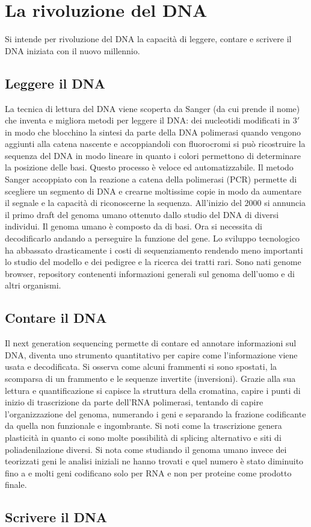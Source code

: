 \section{La rivoluzione del DNA}
Si intende per rivoluzione del DNA la capacit\`a di leggere, contare e scrivere il DNA iniziata con il nuovo millennio. 
\subsection{Leggere il DNA}
La tecnica di lettura del DNA viene scoperta da Sanger (da cui prende il nome) che inventa e migliora metodi per leggere il DNA: dei nucleotidi modificati in $3'$ in modo che blocchino
la sintesi da parte della DNA polimerasi quando vengono aggiunti alla catena nascente e accoppiandoli con fluorocromi si pu\`o ricostruire la sequenza del DNA in modo lineare in quanto
i colori permettono di determinare la posizione delle basi. Questo processo \`e veloce ed automatizzabile. Il metodo Sanger accoppiato con la reazione a catena della polimerasi (PCR)
permette di scegliere un segmento di DNA e crearne moltissime copie  in modo da aumentare il segnale e la capacit\`a di riconoscerne la sequenza. All'inizio del $2000$ si annuncia il 
primo draft del genoma umano ottenuto dallo studio del DNA di diversi individui. Il genoma umano \`e composto da  di basi. Ora si necessita di decodificarlo 
andando a perseguire la funzione del gene. Lo sviluppo tecnologico ha abbassato drasticamente i costi di sequenziamento rendendo meno importanti lo studio del modello e dei pedigree e 
la ricerca dei tratti rari. Sono nati genome browser, repository contenenti informazioni generali sul genoma dell'uomo e di altri organismi. 
\subsection{Contare il DNA}
Il next generation sequencing permette di contare ed annotare informazioni sul DNA, diventa uno strumento quantitativo per capire come l'informazione viene usata e decodificata. Si 
osserva come alcuni frammenti si sono spostati, la scomparsa di un frammento e le sequenze invertite (inversioni). Grazie alla sua lettura e quantificazione si capisce la struttura della
cromatina, capire i punti di inizio di trascrizione da parte dell'RNA polimerasi, tentando di capire l'organizzazione del genoma, numerando i geni e separando la frazione codificante
da quella non funzionale e ingombrante. Si noti come la trascrizione genera plasticit\`a in quanto ci sono molte possibilit\`a di splicing alternativo e siti di poliadenilazione 
diversi. Si nota come studiando il genoma umano invece dei teorizzati  geni le analisi iniziali ne hanno trovati  e quel numero \`e stato diminuito fino 
a  e molti geni codificano solo per RNA e non per proteine come prodotto finale. 
\subsection{Scrivere il DNA}
